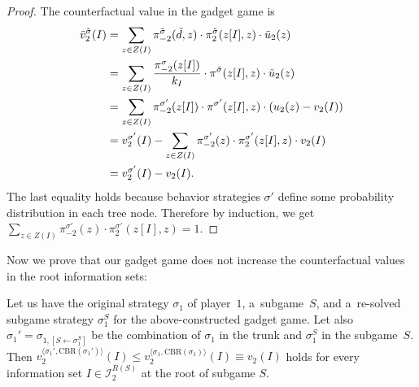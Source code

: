 \begin{proof}
  The counterfactual value in the gadget game is
  \begin{equation*}
    \begin{split}
      \tilde{v}_2^{\tilde{\sigma}} (I)
      &= \sum_{z\in Z(I)}
      \pi_{-2}^{\tilde{\sigma}}(\tilde{d}, z) 
      \cdot \pi_{2}^{\tilde{\sigma}}(z[I], z)
      \cdot \tilde{u}_2(z) \\
      &= \sum_{z\in Z(I)}
      \frac{\pi_{-2}^{\sigma}(z[I])}{k_I}
      \cdot \pi^{\tilde{\sigma}}(z[I], z)
      \cdot \tilde{u}_2(z) \\
      &= \sum_{z\in Z(I)}
      \pi_{-2}^{\sigma'}(z[I])
      \cdot \pi^{\sigma'}(z[I], z)
      \cdot (u_2(z) - v_2(I)) \\
      &= v_2^{\sigma'}(I) - \sum_{z\in Z(I)}
      \pi_{-2}^{\sigma'}(z) 
      \cdot \pi_{2}^{\sigma'}(z[I], z)
      \cdot v_2(I) \\
      &= v_2 ^{\sigma'}(I) - v_2(I).
    \end{split}
  \end{equation*}
  The last equality holds because behavior strategies $\sigma'$ define some probability distribution in each tree node.
  Therefore by induction, we get $\sum_{z\in Z(I)} \pi_{-2}^{\sigma'}(z) \cdot \pi_{2}^{\sigma'}(z[I], z) = 1$.
\end{proof}

Now we prove that our gadget game does not increase the counterfactual values in the root information sets:
\begin{thm}
  \label{thm:cf-val-max-margin-gadget}
  Let us have the original strategy $\sigma_1$ of player~$1$, a~subgame~$S$, and a~re-solved subgame strategy $\sigma_1^S$ for the above-constructed gadget game.
  Let also $\sigma_1' = \sigma_{1, [S \leftarrow \sigma_1^S]}$ be the combination of $\sigma_1$ in the trunk and $\sigma_1^S$ in the subgame~$S$.
  Then $v_2^{\langle\sigma_1', \textrm{CBR}(\sigma_1')\rangle}(I) \leq  v_2^{\langle\sigma_1, \textrm{CBR}(\sigma_1)\rangle}(I) \equiv v_2(I)$ holds for every information set $I\in\mathcal{I}_2^{R(S)}$ at the root of subgame $S$.
\end{thm}

